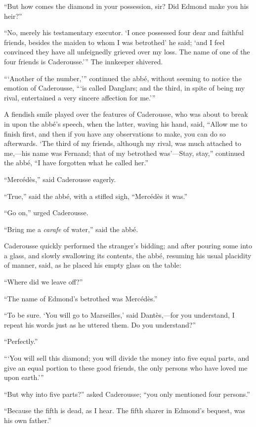 “But how comes the diamond in your possession, sir? Did Edmond make you
his heir?”

“No, merely his testamentary executor. ‘I once possessed four dear and
faithful friends, besides the maiden to whom I was betrothed’ he said;
‘and I feel convinced they have all unfeignedly grieved over my loss.
The name of one of the four friends is Caderousse.’” The innkeeper
shivered.

“‘Another of the number,’” continued the abbé, without seeming to
notice the emotion of Caderousse, “‘is called Danglars; and the third,
in spite of being my rival, entertained a very sincere affection for
me.’”

A fiendish smile played over the features of Caderousse, who was about
to break in upon the abbé’s speech, when the latter, waving his hand,
said, “Allow me to finish first, and then if you have any observations
to make, you can do so afterwards. ‘The third of my friends, although
my rival, was much attached to me,—his name was Fernand; that of my
betrothed was’—Stay, stay,” continued the abbé, “I have forgotten what
he called her.”

“Mercédès,” said Caderousse eagerly.

“True,” said the abbé, with a stifled sigh, “Mercédès it was.”

“Go on,” urged Caderousse.

“Bring me a \textit{carafe} of water,” said the abbé.

Caderousse quickly performed the stranger’s bidding; and after pouring
some into a glass, and slowly swallowing its contents, the abbé,
resuming his usual placidity of manner, said, as he placed his empty
glass on the table:

“Where did we leave off?”

“The name of Edmond’s betrothed was Mercédès.”

“To be sure. ‘You will go to Marseilles,’ said Dantès,—for you
understand, I repeat his words just as he uttered them. Do you
understand?”

“Perfectly.”

“‘You will sell this diamond; you will divide the money into five equal
parts, and give an equal portion to these good friends, the only
persons who have loved me upon earth.’”

“But why into five parts?” asked Caderousse; “you only mentioned four
persons.”

“Because the fifth is dead, as I hear. The fifth sharer in Edmond’s
bequest, was his own father.”

